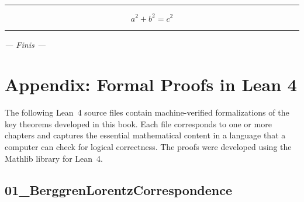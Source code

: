 \documentclass[11pt,openany]{book}
\theoremstyle{definition}
\theoremstyle{plain}
\theoremstyle{remark}
\begin{document}
\bigskip\noindent\rule{\textwidth}{0.4pt}\bigskip


\[
\boxed{a^2 + b^2 = c^2}
\]


\bigskip\noindent\rule{\textwidth}{0.4pt}\bigskip


\textit{— Finis —}

\clearpage

\backmatter

\chapter*{Appendix: Formal Proofs in Lean 4}


The following Lean~4 source files contain machine-verified formalizations
of the key theorems developed in this book. Each file corresponds to one or more
chapters and captures the essential mathematical content in a language that a
computer can check for logical correctness. The proofs were developed using the
Mathlib library for Lean~4.

\bigskip

\section*{01\_BerggrenLorentzCorrespondence}
\end{document}
